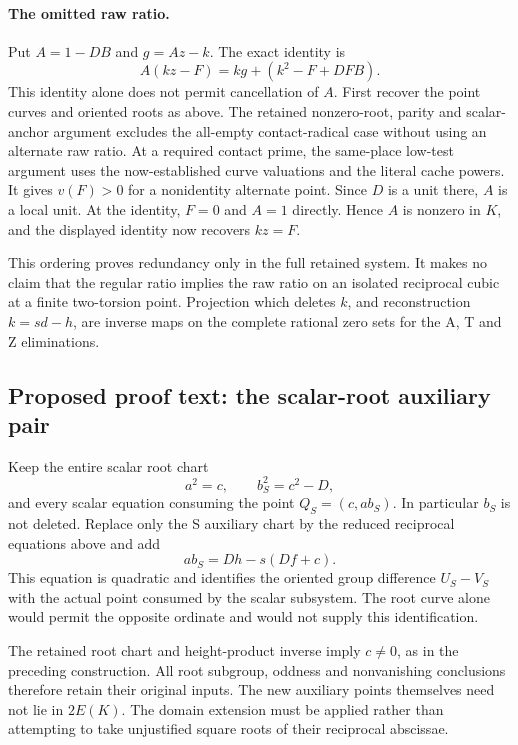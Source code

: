 \documentclass{article}
\begin{document}
\paragraph{The omitted raw ratio.}
Put $A=1-DB$ and $g=Az-k$. The exact identity is
\[
 A(kz-F)=kg+(k^2-F+DFB).
\]
This identity alone does not permit cancellation of $A$. First recover
the point curves and oriented roots as above. The retained nonzero-root,
parity and scalar-anchor argument excludes the all-empty contact-radical
case without using an alternate raw ratio. At a required contact prime,
the same-place low-test argument uses the now-established curve
valuations and the literal cache powers. It gives $v(F)>0$ for a
nonidentity alternate point. Since $D$ is a unit there, $A$ is a local
unit. At the identity, $F=0$ and $A=1$ directly. Hence $A$ is nonzero in
$K$, and the displayed identity now recovers $kz=F$.

This ordering proves redundancy only in the full retained system.
It makes no claim that the regular ratio implies the raw ratio on an
isolated reciprocal cubic at a finite two-torsion point. Projection
which deletes $k$, and reconstruction $k=sd-h$, are inverse maps on
the complete rational zero sets for the A, T and Z eliminations.

\subsection{Proposed proof text: the scalar-root auxiliary pair}
\label{outline:r6-expanded-S}
Keep the entire scalar root chart
\[
 a^2=c,\qquad b_S^2=c^2-D,
\]
and every scalar equation consuming the point $Q_S=(c,ab_S)$.
In particular $b_S$ is not deleted. Replace only the S auxiliary chart
by the reduced reciprocal equations above and add
\[
 ab_S=Dh-s(Df+c).
\]
This equation is quadratic and identifies the oriented group difference
$U_S-V_S$ with the actual point consumed by the scalar subsystem.
The root curve alone would permit the opposite ordinate and would not
supply this identification.

The retained root chart and height-product inverse imply $c\ne0$,
as in the preceding construction. All root subgroup, oddness and
nonvanishing conclusions therefore retain their original inputs.
The new auxiliary points themselves need not lie in $2E(K)$.
The domain extension must be applied rather than attempting to take
unjustified square roots of their reciprocal abscissae.
\end{document}
